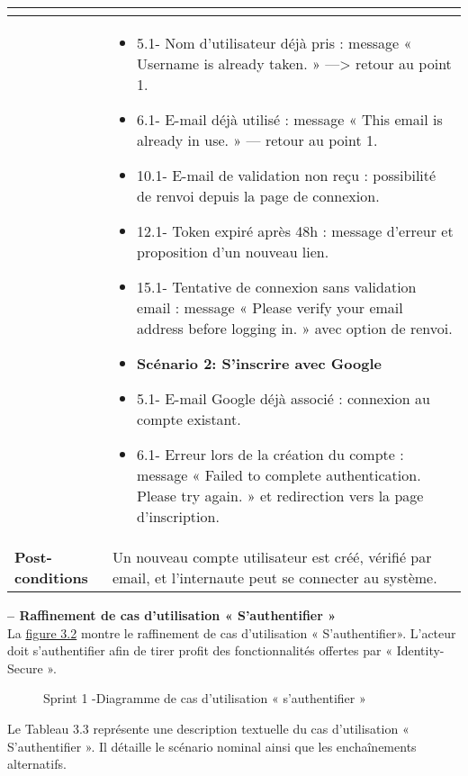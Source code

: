 \begin{longtable}{|>{\arraybackslash}p{4.2cm}|>{\arraybackslash}p{12.5cm}|}
\begin{itemize}[label=]
\end{itemize} \\
\hline
\textbf{}&
\begin{itemize}[label=]
    \item 5.1- Nom d'utilisateur déjà pris : message « Username is already taken. » —> retour au point 1.
    \item 6.1- E-mail déjà utilisé : message « This email is already in use. » — retour au point 1.
    \item 10.1- E-mail de validation non reçu : possibilité de renvoi depuis la page de connexion.
    \item 12.1- Token expiré après 48h : message d'erreur et proposition d'un nouveau lien.
    \item 15.1- Tentative de connexion sans validation email : message « Please verify your email address before logging in. » avec option de renvoi.
    \item \textbf{Scénario 2: S'inscrire avec Google}
    \item 5.1- E-mail Google déjà associé : connexion au compte existant.
    \item 6.1- Erreur lors de la création du compte : message « Failed to complete authentication. Please try again. » et redirection vers la page d'inscription.
\end{itemize}\\
\hline
\textbf{Post-conditions} & Un nouveau compte utilisateur est créé, vérifié par email, et l'internaute peut se connecter au système. \\
\hline
\end{longtable}







\textbf{ – Raffinement de cas d'utilisation « S'authentifier »}
\\
La \hyperref[fig:3.2]{figure 3.2} montre le raffinement de cas d'utilisation « S'authentifier». L'acteur doit
s'authentifier afin de tirer profit des fonctionnalités offertes par « Identity-Secure ».
\begin{figure}[H]
\centering
{}
\caption{ Sprint 1 -Diagramme de cas d'utilisation « s'authentifier » }
\label{fig:3.2}
\end{figure}

Le Tableau 3.3 représente une description textuelle du cas d'utilisation « S'authentifier ». Il détaille le scénario nominal ainsi que les enchaînements alternatifs.


